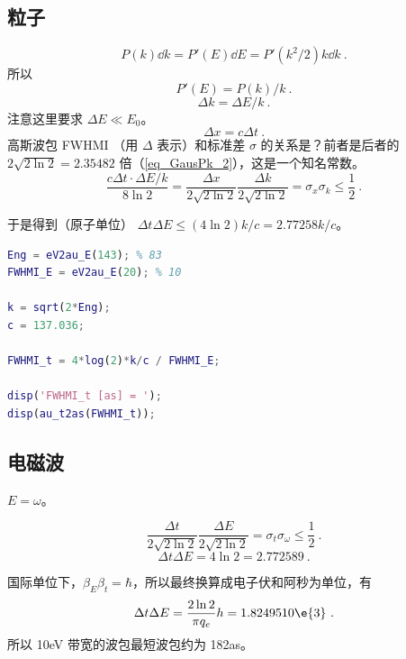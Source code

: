 
\subsection{粒子}
\begin{equation}
P(k)\dd{k} = P'(E)\dd{E} = P'(k^2/2)k\dd{k}~.
\end{equation}
所以
\begin{equation}
P'(E) = P(k)/k~.
\end{equation}
\begin{equation}
\Delta k = \Delta E/k~.
\end{equation}
注意这里要求 $\Delta E \ll E_0$。
\begin{equation}
\Delta x = c\Delta t~.
\end{equation}
高斯波包 FWHMI （用 $\Delta$ 表示）和标准差 $\sigma$ 的关系是？前者是后者的 $2\sqrt{2\ln 2} = 2.35482$ 倍（\autoref{eq_GausPk_2}），这是一个知名常数。
\begin{equation}
\frac{c\Delta t \cdot \Delta E/k}{8\ln 2} = \frac{\Delta x}{2\sqrt{2\ln 2}}\frac{\Delta k}{2\sqrt{2\ln 2}} = \sigma_x \sigma_k \leq \frac{1}{2}~.
\end{equation}

于是得到（原子单位） $\Delta t\Delta E \leq (4\ln 2)k/c = 2.77258 k/c$。

\begin{lstlisting}[language=matlab]
% 以上计算的 Matlab 代码
Eng = eV2au_E(143); % 83
FWHMI_E = eV2au_E(20); % 10

k = sqrt(2*Eng);
c = 137.036;

FWHMI_t = 4*log(2)*k/c / FWHMI_E;

disp('FWHMI_t [as] = ');
disp(au_t2as(FWHMI_t));
\end{lstlisting}

\subsection{电磁波}
$E = \omega$。

\begin{equation}
\frac{\Delta t}{2\sqrt{2\ln 2}}\frac{\Delta E}{2\sqrt{2\ln 2}} = \sigma_t \sigma_\omega \leq \frac{1}{2}~.
\end{equation}
\begin{equation}
\Delta t\Delta E = 4\ln 2 = 2.772589~.
\end{equation}

国际单位下，$\beta_E\beta_t = \hbar$，所以最终换算成电子伏和阿秒为单位，有
\begin{equation}
\Delta t \Delta E  = \frac{2\ln 2}{\pi q_e}h = 1.8249510\e{3}~.
\end{equation}
所以 10eV 带宽的波包最短波包约为 182as。
